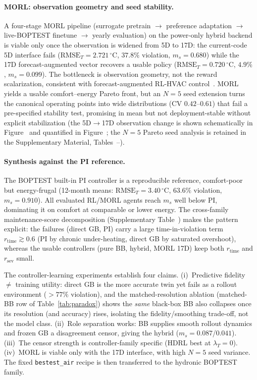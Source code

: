 \paragraph{MORL: observation geometry and seed stability.} A four-stage MORL pipeline (surrogate pretrain $\to$ preference adaptation $\to$ live-BOPTEST finetune $\to$ yearly evaluation) on the power-only hybrid backend is viable only once the observation is widened from 5D to 17D: the current-code 5D interface fails ($\mathrm{RMSE}_T=2.721\,^\circ$C, $37.8\%$ violation, $m_s=0.680$) while the 17D forecast-augmented vector recovers a usable policy ($\mathrm{RMSE}_T=0.720\,^\circ$C, $4.9\%$, $m_s=0.099$). The bottleneck is observation geometry, not the reward scalarization, consistent with forecast-augmented RL-HVAC control~\citep{Gao2024Predictive}. MORL yields a usable comfort--energy Pareto front, but an $N=5$ seed extension turns the canonical operating points into wide distributions (CV $0.42$--$0.61$) that fail a pre-specified stability test, promising in mean but not deployment-stable without explicit stabilization (the 5D$\to$17D observation change is shown schematically in Figure~ and quantified in Figure~; the $N=5$ Pareto seed analysis is retained in the Supplementary Material, Tables~--).

\paragraph{Synthesis against the PI reference.} The BOPTEST built-in PI controller is a reproducible reference, comfort-poor but energy-frugal (12-month means: $\mathrm{RMSE}_T=3.40\,^\circ$C, $63.6\%$ violation, $m_s=0.910$). All evaluated RL/MORL agents reach $m_s$ well below PI, dominating it on comfort at comparable or lower energy. The cross-family maintenance-score decomposition (Supplementary Table~) makes the pattern explicit: the failures (direct GB, PI) carry a large time-in-violation term $r_{\mathrm{time}}\gtrsim0.6$ (PI by chronic under-heating, direct GB by saturated overshoot), whereas the usable controllers (pure BB, hybrid, MORL 17D) keep both $r_{\mathrm{time}}$ and $r_{\mathrm{sev}}$ small.

The controller-learning experiments establish four claims. (i)~Predictive fidelity $\neq$ training utility: direct GB is the more accurate twin yet fails as a rollout environment ($>77\%$ violation), and the matched-resolution ablation (matched-BB row of Table~\ref{tab:paradox}) shows the \emph{same} black-box BB also collapses once its resolution (and accuracy) rises, isolating the fidelity/smoothing trade-off, not the model class. (ii)~Role separation works: BB supplies smooth rollout dynamics and frozen GB a disagreement censor, giving the hybrid ($m_s=0.087$/$0.041$). (iii)~The censor strength is controller-family specific (HDRL best at $\lambda_T=0$). (iv)~MORL is viable only with the 17D interface, with high $N=5$ seed variance. The fixed \texttt{bestest\_air} recipe is then transferred to the hydronic BOPTEST family.
